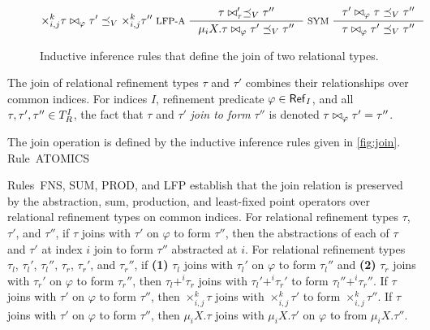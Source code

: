 \begin{figure}
\begin{gather*}
{      %
      \times_{i, j}^k \tau \join{ \varphi } \tau' \subtype_V %
      \times_{i, j}^k \tau'' } 
    \inference[ LFP-A ]{
      \tau \join \tau' \subtype_V \tau'' }{
      \mu_i X. \tau \join{ \varphi } \tau' \subtype_V \tau'' } 
    \inference[ SYM ]{ %
      \tau' \join{ \varphi } \tau \subtype_V \tau'' }{ %
      \tau \join{ \varphi } \tau' \subtype_V \tau'' } 
  \end{gather*}
  \caption{Inductive inference rules that define the join of two relational types.
     }
  \label{fig:join}
\end{figure}
The join of relational refinement types $\tau$ and $\tau'$ combines
their relationships over common indices.
%
For indices $I$, refinement predicate $\varphi \in \mathsf{Ref}_{I}$, and
all $\tau, \tau', \tau'' \in T_{R}^{I}$, the fact that $\tau$ and
$\tau'$ \emph{join to form} $\tau''$ is denoted
$\tau \bowtie_{ \varphi } \tau' = \tau''$.

The join operation is defined by the inductive inference rules given
in \autoref{fig:join}.
Rule~ATOMICS
%

Rules~FNS, SUM, PROD, and LFP establish that the join relation is
preserved by the abstraction, sum, production, and least-fixed point
operators over relational refinement types on common indices.
%
For relational refinement types $\tau$, $\tau'$, and $\tau''$, if
$\tau$ joins with $\tau'$ on $\varphi$ to form $\tau''$, then the
abstractions of each of $\tau$ and $\tau'$ at index $i$ join to form
$\tau''$ abstracted at $i$.
For relational refinement types $\tau_l$, $\tau_l'$, $\tau_l''$,
$\tau_r$, $\tau_r'$, and $\tau_r''$, if %
\textbf{(1)} $\tau_l$ joins with $\tau_l'$ on $\varphi$ to form
$\tau_l''$ and %
\textbf{(2)} $\tau_r$ joins with $\tau_r'$ on $\varphi$ to form
$\tau_r''$, then $\tau_l +^i \tau_r$ joins with $\tau_l' +^i \tau_r'$
to form $\tau_l'' +^i \tau_r''$.
If $\tau$ joins with $\tau'$ on $\varphi$ to form $\tau''$, then %
$\times_{i, j}^k \tau$ joins with $\times_{i, j}^k \tau'$ to form
$\times_{i, j}^k \tau''$.
If $\tau$ joins with $\tau'$ on $\varphi$ to form $\tau''$, then %
$\mu_i X. \tau$ joins with $\mu_i X. \tau'$ on $\varphi$ to from
$\mu_i X. \tau''$.


